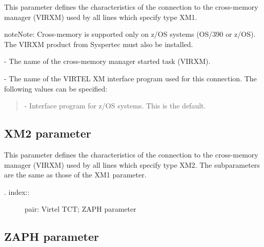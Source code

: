\documentclass[letterpaper,10pt,english]{sphinxmanual}
\begin{document}
This parameter defines the characteristics of the connection to the cross-memory manager (VIRXM) used by all lines which specify type XM1.

\begin{sphinxadmonition}{note}{Note:}
Cross-memory is supported only on z/OS systems (OS/390 or z/OS). The VIRXM product from Syspertec must also be installed.
\end{sphinxadmonition}

 - The name of the cross-memory manager started task (VIRXM).

 - The name of the VIRTEL XM interface program used for this connection. The following values can be specified:
\begin{quote}

 - Interface program for z/OS systems. This is the default.
\end{quote}


\subsection{XM2 parameter}
\label{\detokenize{Installation_Guide:xm2-parameter}}
\begin{sphinxVerbatim}[commandchars=\\\{\}]
    
\PYG{p}{[}\PYG{p}{]}\PYG{p}{[}\PYG{p}{]}
\end{sphinxVerbatim}

This parameter defines the characteristics of the connection to the cross-memory manager (VIRXM) used by all lines which specify type XM2. The subparameters are the same as those of the XM1 parameter.
\begin{description}
\item[{. index::}] \leavevmode
pair: Virtel TCT; ZAPH parameter

\end{description}


\subsection{ZAPH parameter}
\label{\detokenize{Installation_Guide:zaph-parameter}}
\begin{sphinxVerbatim}[commandchars=\\\{\}]
 
\end{sphinxVerbatim}
\end{document}
